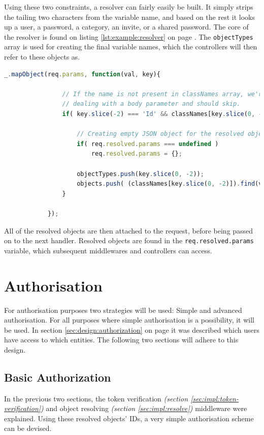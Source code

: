 		Using these two constraints, a resolver can fairly easily be built. It simply strips the tailing two characters from the variable name, and based on the rest it looks up a user, a password, a category, an invite, or a shared password. The core of the resolver is found on listing \ref{lst:example:resolver} on page \pageref{lst:example:resolver}. The \verb=objectTypes= array is used for creating the final variable names, which the controllers will then refer to these objects as.

		\begin{lstlisting}[gobble=12,language=JavaScript,caption={Object resolver middleware},label={lst:example:resolver}]
            _.mapObject(req.params, function(val, key){
            
                // If the name is not present in classNames array, we're
                // dealing with a body parameter and should skip.
                if( key.slice(-2) === 'Id' && classNames[key.slice(0, -2)] !== undefined ){
                    
                    // Creating empty JSON object for the resolved objects to be placed in
                    if( req.resolved.params === undefined ) 
                        req.resolved.params = {};
                    
                    objectTypes.push(key.slice(0, -2));
                    objects.push( (classNames[key.slice(0, -2)]).find(val) );
                }
            
            });
		\end{lstlisting}

		All of the resolved objects are then attached to the request, before being passed on to the next handler. Resolved objects are found in the \verb=req.resolved.params= variable, which subsequent middlewares and controllers can access.

	\section{Authorisation}
		\label{sec:impl:authorization}
		For authorisation purposes two strategies will be used: Simple and advanced authorisation. For all purposes where simple authorisation is a possibility, it will be used. In section \ref{sec:design:authorization} on page \pageref{sec:design:authorization} it was described which users have access to which entities. The following two sections will adhere to this design.

		\subsection{Basic Authorization}
			In the previous two sections, the token verification \emph{(section \ref{sec:impl:token-verification})} and object resolving  \emph{(section \ref{sec:impl:resolve})} middleware were explained. Using these resolved objects' IDs, a very simple authorisation scheme can be devised.

